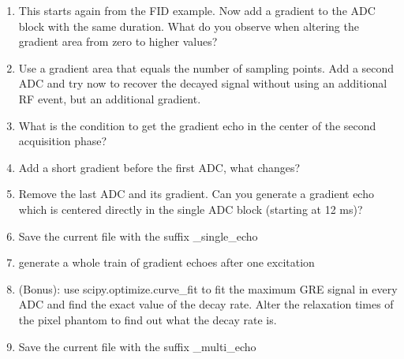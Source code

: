 \documentclass[a4paper,12pt]{extarticle}
\begin{document}
\begin{enumerate}
\item 	This starts again from the FID example. Now add a gradient to the ADC block with the same duration. What do you observe when altering the gradient area from zero to higher values?
\item 	Use a gradient area that equals the number of sampling points. Add a second ADC and try now to recover the decayed signal without using an additional RF event, but an additional gradient.
\item	What is the condition to get the gradient echo in the center of the second acquisition phase?
\item 	Add a short gradient before the first ADC, what changes?
\item 	Remove the last ADC and its gradient. Can you generate a gradient echo which is centered directly in the single ADC block (starting at 12 ms)?

\item Save the current file with the suffix \_single\_echo

\item generate a whole train of gradient echoes after one excitation
\item	(Bonus): use scipy.optimize.curve\_fit to fit the maximum GRE signal in every ADC and find the exact value of the decay rate. Alter the relaxation times of the pixel phantom to find out what the decay rate is.

\item Save the current file with the suffix \_multi\_echo

\end{enumerate}
\end{document}

